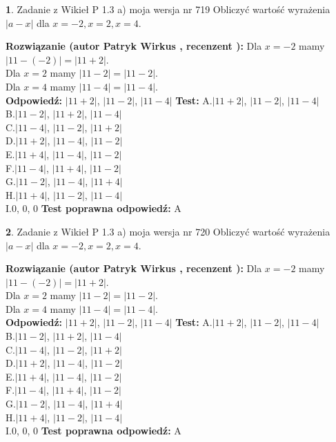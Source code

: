\documentclass[12pt, a4paper]{article}
\theoremstyle{definition} %
\newtheorem{zad}{}
\newcommand{\zadStart}[1]{\begin{zad}#1\newline}
\newcommand{\zadStop}{\end{zad}}
\newcommand{\rozwStart}[2]{\noindent \textbf{Rozwiązanie (autor #1 , recenzent #2): }\newline}
\newcommand{\rozwStop}{\newline}
\newcommand{\odpStart}{\noindent \textbf{Odpowiedź:}\newline}
\newcommand{\odpStop}{\newline}
\newcommand{\testStart}{\noindent \textbf{Test:}\newline}
\newcommand{\testStop}{\newline}
\newcommand{\kluczStart}{\noindent \textbf{Test poprawna odpowiedź:}\newline}
\newcommand{\kluczStop}{\newline}
\begin{document}
\zadStart{Zadanie z Wikieł P 1.3 a) moja wersja nr 719}
Obliczyć wartość wyrażenia $|a - x|$ dla $x=-2,x=2,x=4$.
\zadStop
\rozwStart{Patryk Wirkus}{}
Dla $x = -2$ mamy $|11 - (-2)| = |11 + 2|$.\\
Dla $x = 2$ mamy $|11 - 2| = |11 - 2|$.\\
Dla $x = 4$ mamy $|11 - 4| = |11 - 4|$.\\
\rozwStop
\odpStart
$|11 + 2|$, $|11 - 2|$, $|11 - 4|$
\odpStop
\testStart
A.$|11 + 2|$, $|11 - 2|$, $|11 - 4|$\\
B.$|11 - 2|$, $|11 + 2|$, $|11 - 4|$\\
C.$|11 - 4|$, $|11 - 2|$, $|11 + 2|$\\
D.$|11 + 2|$, $|11 - 4|$, $|11 - 2|$\\
E.$|11 + 4|$, $|11 - 4|$, $|11 - 2|$\\
F.$|11 - 4|$, $|11 + 4|$, $|11 - 2|$\\
G.$|11 - 2|$, $|11 - 4|$, $|11 + 4|$\\
H.$|11 + 4|$, $|11 - 2|$, $|11 - 4|$\\
I.$0$, $0$, $0$
\testStop
\kluczStart
A
\kluczStop



\zadStart{Zadanie z Wikieł P 1.3 a) moja wersja nr 720}
Obliczyć wartość wyrażenia $|a - x|$ dla $x=-2,x=2,x=4$.
\zadStop
\rozwStart{Patryk Wirkus}{}
Dla $x = -2$ mamy $|11 - (-2)| = |11 + 2|$.\\
Dla $x = 2$ mamy $|11 - 2| = |11 - 2|$.\\
Dla $x = 4$ mamy $|11 - 4| = |11 - 4|$.\\
\rozwStop
\odpStart
$|11 + 2|$, $|11 - 2|$, $|11 - 4|$
\odpStop
\testStart
A.$|11 + 2|$, $|11 - 2|$, $|11 - 4|$\\
B.$|11 - 2|$, $|11 + 2|$, $|11 - 4|$\\
C.$|11 - 4|$, $|11 - 2|$, $|11 + 2|$\\
D.$|11 + 2|$, $|11 - 4|$, $|11 - 2|$\\
E.$|11 + 4|$, $|11 - 4|$, $|11 - 2|$\\
F.$|11 - 4|$, $|11 + 4|$, $|11 - 2|$\\
G.$|11 - 2|$, $|11 - 4|$, $|11 + 4|$\\
H.$|11 + 4|$, $|11 - 2|$, $|11 - 4|$\\
I.$0$, $0$, $0$
\testStop
\kluczStart
A
\kluczStop
\end{document}
